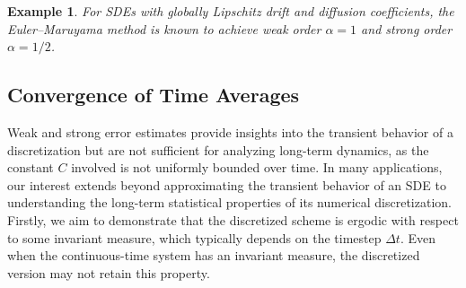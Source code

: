 \documentclass{article}
\newtheorem{example}[theorem]{Example}
\begin{document}
\begin{example}
    For SDEs with globally Lipschitz drift and diffusion coefficients, the Euler–Maruyama method is known to achieve weak order $\alpha = 1$ and strong order $\alpha = 1/2$. 
\end{example}

\subsection{Convergence of Time Averages}
Weak and strong error estimates provide insights into the transient behavior of a discretization but are not sufficient for analyzing long-term dynamics, as the constant $C$ involved is not uniformly bounded over time. In many applications, our interest extends beyond approximating the transient behavior of an SDE to understanding the long-term statistical properties of its numerical discretization. Firstly, we aim to demonstrate that the discretized scheme is ergodic with respect to some invariant measure, which typically depends on the timestep $\Delta t$. Even when the continuous-time system has an invariant measure, the discretized version may not retain this property.
\end{document}
